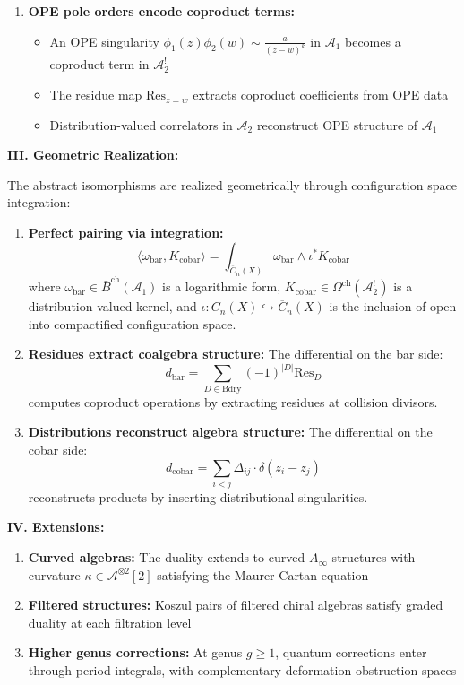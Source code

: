 \begin{theorem}
\begin{enumerate}
\item \textbf{OPE pole orders encode coproduct terms:}
   \begin{itemize}
   \item An OPE singularity $\phi_1(z)\phi_2(w) \sim \frac{a}{(z-w)^k}$ in $\mathcal{A}_1$ becomes a coproduct term in $\mathcal{A}_2^!$
   \item The residue map $\text{Res}_{z=w}$ extracts coproduct coefficients from OPE data
   \item Distribution-valued correlators in $\mathcal{A}_2$ reconstruct OPE structure of $\mathcal{A}_1$
   \end{itemize}
\end{enumerate}

\medskip
\noindent\textbf{III. Geometric Realization:}

The abstract isomorphisms are realized geometrically through configuration space integration:

\begin{enumerate}
\item \textbf{Perfect pairing via integration:}
   $$\langle \omega_{\text{bar}}, K_{\text{cobar}} \rangle = \int_{\overline{C}_n(X)} \omega_{\text{bar}} \wedge \iota^* K_{\text{cobar}}$$
   where $\omega_{\text{bar}} \in \bar{B}^{\text{ch}}(\mathcal{A}_1)$ is a logarithmic form, $K_{\text{cobar}} \in \Omega^{\text{ch}}(\mathcal{A}_2^!)$ is a distribution-valued kernel, and $\iota: C_n(X) \hookrightarrow \overline{C}_n(X)$ is the inclusion of open into compactified configuration space.

\item \textbf{Residues extract coalgebra structure:}
   The differential on the bar side:
   $$d_{\text{bar}} = \sum_{D \in \text{Bdry}} (-1)^{|D|} \text{Res}_D$$
   computes coproduct operations by extracting residues at collision divisors.

\item \textbf{Distributions reconstruct algebra structure:}
   The differential on the cobar side:
   $$d_{\text{cobar}} = \sum_{i<j} \Delta_{ij} \cdot \delta(z_i - z_j)$$
   reconstructs products by inserting distributional singularities.
\end{enumerate}

\medskip
\noindent\textbf{IV. Extensions:}
\begin{enumerate}
\item \textbf{Curved algebras:} The duality extends to curved $A_\infty$ structures with curvature $\kappa \in \mathcal{A}^{\otimes 2}[2]$ satisfying the Maurer-Cartan equation

\item \textbf{Filtered structures:} Koszul pairs of filtered chiral algebras satisfy graded duality at each filtration level

\item \textbf{Higher genus corrections:} At genus $g \geq 1$, quantum corrections enter through period integrals, with complementary deformation-obstruction spaces
\end{enumerate}
\end{theorem}





